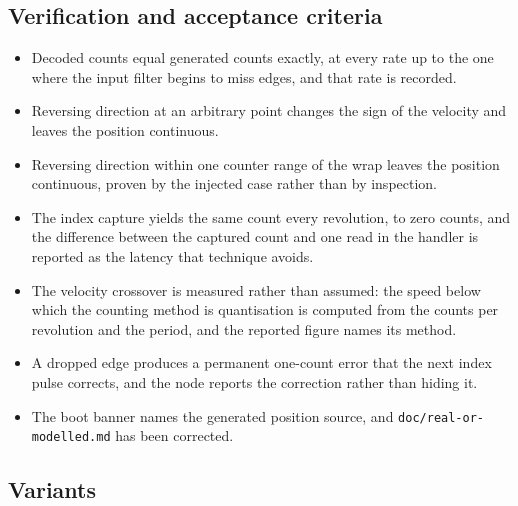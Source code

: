 \subsection*{Verification and acceptance criteria}

\begin{itemize}
\item Decoded counts equal generated counts exactly, at every rate up to the one
where the input filter begins to miss edges, and that rate is recorded.
\item Reversing direction at an arbitrary point changes the sign of the velocity
and leaves the position continuous.
\item Reversing direction within one counter range of the wrap leaves the
position continuous, proven by the injected case rather than by inspection.
\item The index capture yields the same count every revolution, to zero counts,
and the difference between the captured count and one read in the handler is
reported as the latency that technique avoids.
\item The velocity crossover is measured rather than assumed: the speed below
which the counting method is quantisation is computed from the counts per
revolution and the period, and the reported figure names its method.
\item A dropped edge produces a permanent one-count error that the next index
pulse corrects, and the node reports the correction rather than hiding it.
\item The boot banner names the generated position source, and
\texttt{doc/real-or-modelled.md} has been corrected.
\end{itemize}

\subsection*{Variants}

